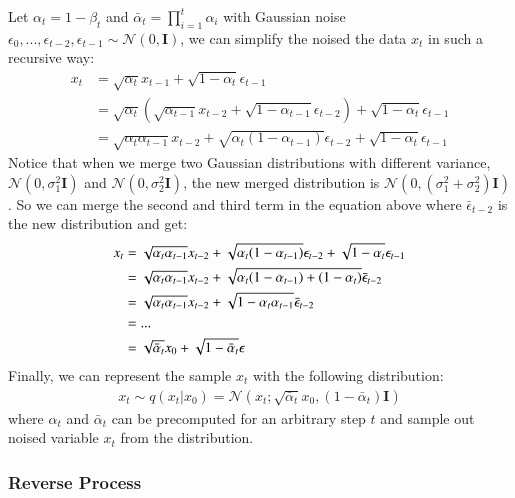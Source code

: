 \documentclass[12pt,DIV14,BCOR12mm,a4paper,footinclude=false,headinclude,parskip=half-,twoside,openright,cleardoublepage=empty,toc=index,bibliography=totoc,listof=totoc]{scrreprt}
\numberwithin{equation}{chapter}
\begin{document}
Let $\alpha_{t} = 1 - \beta_{t}$ and $\bar{\alpha}_{t} = \prod_{i=1}^{t}\alpha_{i}$ 
with Gaussian noise $\epsilon_{0},...,\epsilon_{t-2},\epsilon_{t-1} \sim \mathcal{N}(0, \textbf{I})$,
we can simplify the noised the data $x_{t}$ in such a recursive way:
\begin{align*}
  x_{t} &= \sqrt{\alpha_{t}}x_{t-1} + \sqrt{1-\alpha_{t}}\epsilon_{t-1}\\
        &= \sqrt{\alpha_{t}}(\sqrt{\alpha_{t-1}}x_{t-2} + \sqrt{1-\alpha_{t-1}}\epsilon_{t-2}) + \sqrt{1-\alpha_{t}}\epsilon_{t-1}\\
        &= \sqrt{\alpha_{t}\alpha_{t-1}}x_{t-2} + \sqrt{\alpha_{t}(1-\alpha_{t-1})}\epsilon_{t-2} + \sqrt{1-\alpha_{t}}\epsilon_{t-1}
\end{align*}
Notice that when we merge two Gaussian distributions with different variance, $\mathcal{N} (0, \sigma^{2}_{1}\textbf{I})$ and $\mathcal{N} (0, \sigma^{2}_{2}\textbf{I})$,
the new merged distribution is $\mathcal{N} (0, (\sigma^{2}_{1} + \sigma^{2}_{2})\textbf{I})$. 
So we can merge the second and third term in the equation above where $\bar{\epsilon}_{t-2}$ is the new distribution and get:
\begin{align}
  x_{t} &= \sqrt{\alpha_{t}\alpha_{t-1}}x_{t-2} + \sqrt{\alpha_{t}(1-\alpha_{t-1})}\epsilon_{t-2} + \sqrt{1-\alpha_{t}}\epsilon_{t-1}\notag\\
        &= \sqrt{\alpha_{t}\alpha_{t-1}}x_{t-2} + \sqrt{\alpha_{t}(1-\alpha_{t-1}) + (1-\alpha_{t})}\bar{\epsilon}_{t-2}\notag\\
        &= \sqrt{\alpha_{t}\alpha_{t-1}}x_{t-2} + \sqrt{1-\alpha_{t}\alpha_{t-1}}\bar{\epsilon}_{t-2}\notag\\
        &=...\notag\\
        &= \sqrt{\bar{\alpha}_{t}}x_{0} + \sqrt{1-\bar{\alpha}_{t}}\epsilon
\end{align}
Finally, we can represent the sample $x_{t}$ with the following distribution:
\begin{align}
  x_{t} \sim q(x_{t}|x_{0}) = \mathcal{N}(x_{t}; \sqrt{\bar{\alpha}_{t}}x_{0}, (1-\bar{\alpha}_{t})\textbf{I})
\end{align}
where $\alpha_{t}$ and $\bar{\alpha}_{t}$ can be precomputed for an arbitrary step $t$ and sample out noised variable $x_{t}$ from the distribution.
\subsubsection{Reverse Process}
\end{document}
